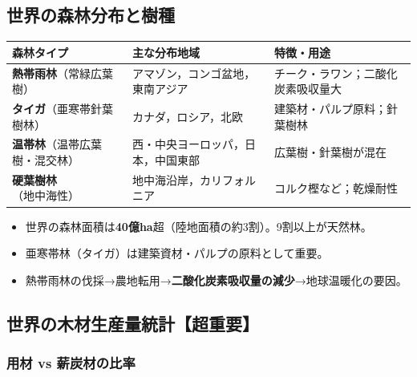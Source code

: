 \documentclass[a4paper,11pt]{article}
\newcommand{\imp}[1]{\textbf{\textcolor{mainred}{#1}}}
\newcommand{\key}[1]{\textbf{\textcolor{mainblue}{#1}}}
\begin{document}
\vspace{2mm}

\subsection{世界の森林分布と樹種}

\begin{tcolorbox}[pointbox, title={■ 主要な森林タイプと分布}]
\begin{tabular}{L{3cm}L{4.5cm}L{5cm}}
\toprule
{}
\textbf{森林タイプ} & \textbf{主な分布地域} & \textbf{特徴・用途} \\
\midrule
\key{熱帯雨林}（常緑広葉樹） & アマゾン，コンゴ盆地，東南アジア & チーク・ラワン；二酸化炭素吸収量大 \\
\addlinespace
\key{タイガ}（亜寒帯針葉樹林） & カナダ，ロシア，北欧 & 建築材・パルプ原料；針葉樹林 \\
\addlinespace
\key{温帯林}（温帯広葉樹・混交林） & 西・中央ヨーロッパ，日本，中国東部 & 広葉樹・針葉樹が混在 \\
\addlinespace
\key{硬葉樹林}（地中海性） & 地中海沿岸，カリフォルニア & コルク樫など；乾燥耐性 \\
\bottomrule
\end{tabular}

\medskip
\begin{itemize}[leftmargin=1em]
  \item 世界の森林面積は\imp{40億ha}超（陸地面積の約3割）。9割以上が天然林。
  \item 亜寒帯林（タイガ）は建築資材・パルプの原料として重要。
  \item 熱帯雨林の伐採→農地転用→\imp{二酸化炭素吸収量の減少}→地球温暖化の要因。
\end{itemize}
\end{tcolorbox}

\vspace{2mm}

\subsection{世界の木材生産量統計【超重要】}

\subsubsection{用材 vs 薪炭材の比率}
\end{document}
